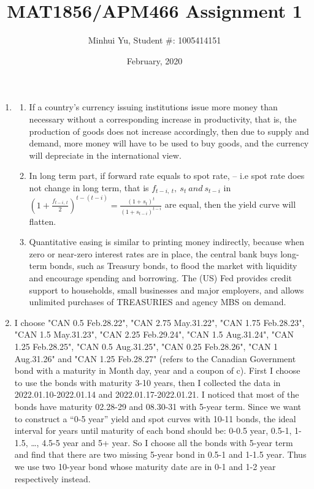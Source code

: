 \documentclass[10pt]{article}
\title{MAT1856/APM466 Assignment 1}
\author{Minhui Yu, Student \#: 1005414151}
\date{February, 2020}
\begin{document}
\maketitle

\begin{enumerate}
    \item
    \begin{enumerate}
        \item 
            If a country's currency issuing institutions issue more money than necessary without a corresponding increase in productivity, that is, the production of goods does not increase accordingly, then due to supply and demand, more money will have to be used to buy goods, and the currency will depreciate in the international view.
        \item
            In long term part, if forward rate equals to spot rate, -- i.e spot rate does not change in long term, that is $f_{t-i,\ t}, \ s_t \ and \ 
             s_{t-i}$ in $(1 + \frac{f_{t-i,\ t}}{2})^{t-(t-i)} = \frac{(1+s_t)^t}{(1+s_{t-i})^{t-i}}$ are equal, then the yield curve will flatten. 
        \item
            Quantitative easing is similar to printing money indirectly, because when zero or near-zero interest rates are in place, the central bank buys long-term bonds, such as Treasury bonds, to flood the market with liquidity and encourage spending and borrowing. The (US) Fed provides credit support to households, small businesses and major employers, and allows unlimited purchases of TREASURIES and agency MBS on demand.
    \end{enumerate}
    \item 
        I choose "CAN 0.5 Feb.28.22", "CAN 2.75 May.31.22", "CAN 1.75 Feb.28.23", "CAN 1.5 May.31.23", "CAN 2.25 Feb.29.24", "CAN 1.5 Aug.31.24", "CAN 1.25 Feb.28.25", "CAN 0.5 Aug.31.25", "CAN 0.25 Feb.28.26", "CAN 1 Aug.31.26" and "CAN 1.25 Feb.28.27" (refers to the Canadian Government bond with a maturity in Month day, year and a coupon of c). First I choose to use the bonds with maturity 3-10 years, then I collected the data in 2022.01.10-2022.01.14 and 2022.01.17-2022.01.21. I noticed that most of the bonds have maturity 02.28-29 and 08.30-31 with 5-year term. Since we want to construct a “0-5 year” yield and spot curves with 10-11 bonds, the ideal interval for years until maturity of each bond should be: 0-0.5 year, 0.5-1, 1-1.5, \dots, 4.5-5 year and 5+ year. So I choose all the bonds with 5-year term and find that there are two missing 5-year bond in 0.5-1 and 1-1.5 year. Thus we use two 10-year bond whose maturity date are in 0-1 and 1-2 year respectively instead.

\end{enumerate}
\end{document}
